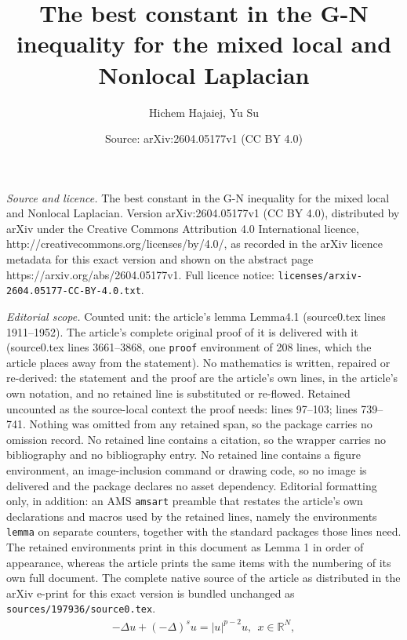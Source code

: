 \documentclass[10pt,a4paper]{amsart}
\title{The best constant in the G-N inequality for the mixed local and Nonlocal Laplacian}
\author{Hichem Hajaiej, Yu Su}
\date{Source: arXiv:2604.05177v1 (CC BY 4.0)}
\begin{document}
\maketitle

\noindent\emph{Source and licence.} The best constant in the G-N inequality for the mixed local and Nonlocal Laplacian. Version arXiv:2604.05177v1 (CC BY 4.0), distributed by arXiv under the Creative Commons Attribution 4.0 International licence, http://creativecommons.org/licenses/by/4.0/, as recorded in the arXiv licence metadata for this exact version and shown on the abstract page https://arxiv.org/abs/2604.05177v1. Full licence notice: \texttt{licenses/arxiv-2604.05177-CC-BY-4.0.txt}.\par\smallskip

\noindent\textit{Editorial scope.} Counted unit: the article's lemma Lemma4.1 (source0.tex lines 1911--1952). The article's complete original proof of it is delivered with it (source0.tex lines 3661--3868, one \texttt{proof} environment of 208 lines, which the article places away from the statement). No mathematics is written, repaired or re-derived: the statement and the proof are the article's own lines, in the article's own notation, and no retained line is substituted or re-flowed.  Retained uncounted as the source-local context the proof needs: lines 97--103; lines 739--741.  Nothing was omitted from any retained span, so the package carries no omission record.  No retained line contains a citation, so the wrapper carries no bibliography and no bibliography entry.  No retained line contains a figure environment, an image-inclusion command or drawing code, so no image is delivered and the package declares no asset dependency.  Editorial formatting only, in addition: an AMS \texttt{amsart} preamble that restates the article's own declarations and macros used by the retained lines, namely the environments \texttt{lemma} on separate counters, together with the standard packages those lines need.  The retained environments print in this document as Lemma 1 in order of appearance, whereas the article prints the same items with the numbering of its own full document.  The complete native source of the article as distributed in the arXiv e-print for this exact version is bundled unchanged as \texttt{sources/197936/source0.tex}.
\begin{equation}\label{P}
\begin{aligned}
-\Delta u
+(-\Delta)^{s}u =|u|^{p-2}u, \ \ x\in\mathbb{R}^{N},
\end{aligned}
\tag{$P$}
\end{equation}
\end{document}
